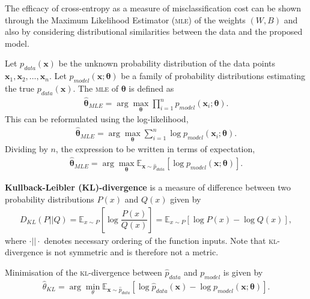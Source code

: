 The efficacy of cross-entropy as a measure of misclassification cost can be shown through the Maximum Likelihood Estimator (\textsc{mle}) of the weights $(W, B)$ and also by considering distributional similarities between the data and the proposed model.

Let ${p}_{data}(\mathbf{x})$ be the unknown probability distribution of the data points $\mathbf{x}_1, \mathbf{x}_2, \ldots, \mathbf{x}_n$. Let $p_{model}(\mathbf{x}; \mathbf{\theta})$ be a family of probability distributions estimating the true $p_{data}(\mathbf{x})$. The \textsc{mle} of $\mathbf{\theta}$ is defined as
\begin{align}
	\hat{\mathbf{\theta}}_{MLE} = \arg\max_{\mathbf{\theta}}\prod_{i=1}^np_{model}(\mathbf{x}_i;\mathbf{\theta}).
\end{align}
This can be reformulated using the log-likelihood,
\begin{align}
	\hat{\mathbf{\theta}}_{MLE} = \arg\max_{\mathbf{\theta}}\sum_{i=1}^n\log p_{model}(\mathbf{x}_i;\mathbf{\theta}).
\end{align}
Dividing by $n$, the expression to be written in terms of expectation,
\begin{align}\label{nnets-mle-eq}
	\hat{\mathbf{\theta}}_{MLE} = \arg\max_{\mathbf{\theta}}\mathbb{E}_{\mathbf{x}\sim \hat{p}_{data}}\left[\log p_{model}(\mathbf{x}; \mathbf{\theta})\right].
\end{align}

\begin{definition}
	\textbf{Kullback-Leibler (KL)-divergence} is a measure of difference between two probability distributions $P(x)$ and $Q(x)$ given by
	\begin{align}
		D_{KL}(P||Q) = \mathbb{E}_{x\sim P}\left[\log\dfrac{P(x)}{Q(x)}\right] = \mathbb{E}_{x\sim P}[\log P(x) - \log Q(x)],
	\end{align}
	where $\cdot||\cdot$ denotes necessary ordering of the function inputs. Note that \textsc{kl}-divergence is not symmetric and is therefore not a metric.	
\end{definition}

Minimisation of the \textsc{kl}-divergence between $\hat{p}_{data}$ and $p_{model}$ is given by
\begin{align}\label{nnets-kl-eq}
	\hat{\theta}_{KL} = \arg\min_\theta\mathbb{E}_{\mathbf{x}\sim\hat{p}_{data}}\left[\log \hat{p}_{data}(\mathbf{x}) - \log p_{model}(\mathbf{x};\mathbf{\theta})\right].
\end{align}

